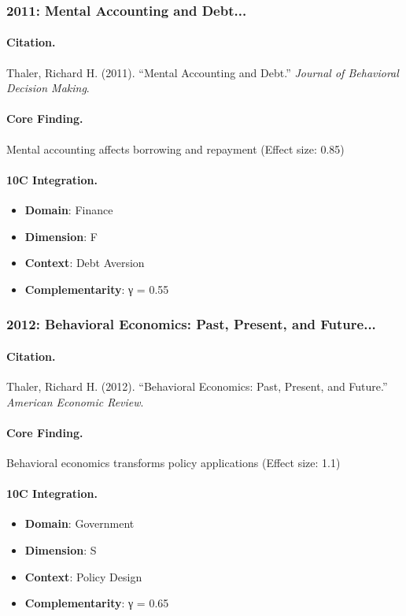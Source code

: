 \subsubsection{2011: Mental Accounting and Debt...}

\paragraph{Citation.}
Thaler, Richard H. (2011). ``Mental Accounting and Debt.''
\textit{Journal of Behavioral Decision Making}.

\paragraph{Core Finding.}
Mental accounting affects borrowing and repayment (Effect size: 0.85)

\paragraph{10C Integration.}
\begin{itemize}[nosep]
  \item \textbf{Domain}: Finance
  \item \textbf{Dimension}: F
  \item \textbf{Context}: Debt Aversion
  \item \textbf{Complementarity}: γ = 0.55
\end{itemize}

\subsubsection{2012: Behavioral Economics: Past, Present, and Future...}

\paragraph{Citation.}
Thaler, Richard H. (2012). ``Behavioral Economics: Past, Present, and Future.''
\textit{American Economic Review}.

\paragraph{Core Finding.}
Behavioral economics transforms policy applications (Effect size: 1.1)

\paragraph{10C Integration.}
\begin{itemize}[nosep]
  \item \textbf{Domain}: Government
  \item \textbf{Dimension}: S
  \item \textbf{Context}: Policy Design
  \item \textbf{Complementarity}: γ = 0.65
\end{itemize}


